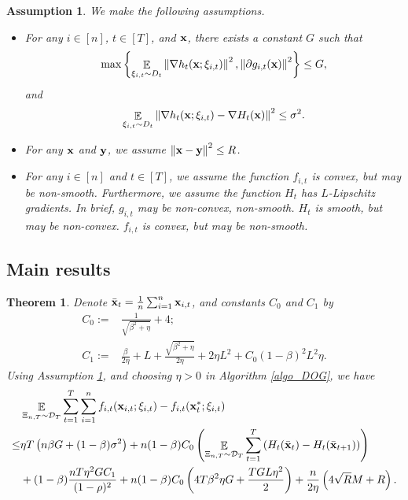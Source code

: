 \documentclass{article}
\newtheorem{Theorem}{\bf{Theorem}}
\newtheorem{Assumption}{\bf{Assumption}}
\begin{document}
\begin{Assumption}
\label{assumption_bounded_gradient_domain}
We make the following assumptions.
\begin{itemize}
\item For any $i\in[n]$, $t\in[T]$, and ${\bf x}$, there exists a constant $G$ such that
\begin{align}
\nonumber
\max\left\{ \mathop{\mathbb{E}}_{ \xi_{i,t} \sim D_t }\left\lVert\nabla h_t({\bf x};\xi_{i,t})\right\rVert^2,  \left\lVert\partial g_{i,t}({\bf x})\right\rVert^2 \right\} \le G,
\end{align} and 
\begin{align}
\nonumber
\mathop{\mathbb{E}}_{ \xi_{i,t} \sim D_t } \left\lVert\nabla h_t({\bf x}; \xi_{i,t}) - \nabla H_t({\bf x})\right\rVert^2 \le \sigma^2.
\end{align}
\item For any ${\bf x}$ and ${\bf y}$, we assume $\left\lVert{\bf x}-{\bf y}\right\rVert^2 \le R$.
\item {\color{blue} For any $i\in[n]$ and $t\in[T]$, we assume the function $f_{i,t}$ is convex, but may be non-smooth. Furthermore, we assume the function $H_t$ has  $L$-Lipschitz gradients. In brief, $g_{i,t}$ may be non-convex, non-smooth. $H_t$ is smooth, but may be non-convex. $f_{i,t}$ is convex, but may be non-smooth.}
\end{itemize}
\end{Assumption}




\subsection{Main results}


\begin{Theorem}
\label{theorem_regret_upper_bound}
Denote $\bar{{\bf x}}_t = \frac{1}{n}\sum_{i=1}^n {\bf x}_{i,t}$, and constants $C_0$ and $C_1$ by
\begin{align}
\nonumber
C_0 := & \frac{1}{\sqrt{\beta^2 + \eta}} + 4; \\ \nonumber
C_1 := & \frac{\beta}{2\eta } +L + \frac{\sqrt{\beta^2 + \eta}}{2\eta} + 2\eta L^2  + C_0 (1-\beta)^2L^2 \eta.
\end{align} Using Assumption \ref{assumption_bounded_gradient_domain}, and choosing $\eta>0$ in Algorithm \ref{algo_DOG}, we have
\begin{align}
\nonumber
& \mathop{\mathbb{E}}_{ \Xi_{n,T} \sim \mathcal{D}_{T} } \sum_{t=1}^T\sum_{i=1}^n f_{i,t}({\bf x}_{i,t};\xi_{i,t}) - f_{i,t}({\bf x}_t^\ast;\xi_{i,t}) \\ \nonumber
\le & \eta T \left(  n\beta G + (1-\beta)\sigma^2 \right) + n(1-\beta)C_0 \left(  \mathop{\mathbb{E}}_{ \Xi_{n,T} \sim \mathcal{D}_{T} } \sum_{t=1}^T  \left( H_t(\bar{{\bf x}}_t) - H_t(\bar{{\bf x}}_{t+1}) \right)   \right) \\ \nonumber
& + (1-\beta)  \frac{nT\eta^2 G C_1}{(1-\rho)^2}  + n(1-\beta)C_0 \left(  4T\beta^2 \eta G + \frac{TGL\eta^2}{2}  \right)  + \frac{n}{2\eta}\left(  4\sqrt{R}M + R   \right).
\end{align}

\end{Theorem}
\end{document}
